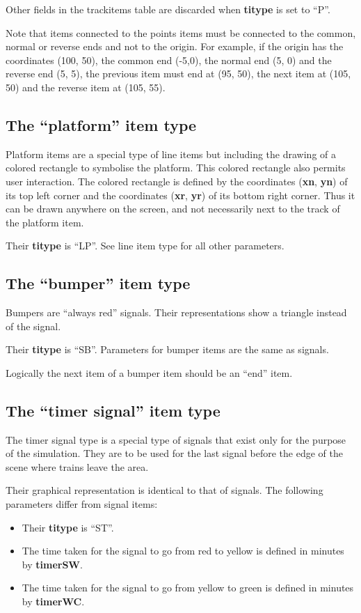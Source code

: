 \documentclass[12pt,a4paper]{article}
\begin{document}
Other fields in the trackitems table are discarded when \textbf{titype} is set to ``P''.

Note that items connected to the points items must be connected to the common, normal or reverse ends and not to the origin. For example, if the origin has the coordinates (100, 50), the common end (-5,0), the normal end (5, 0) and the reverse end (5, 5), the previous item must end at (95, 50), the next item at (105, 50) and the reverse item at (105, 55).

\subsection{The ``platform'' item type}
Platform items are a special type of line items but including the drawing of a colored rectangle to symbolise the platform. This colored rectangle also permits user interaction. The colored rectangle is defined by the coordinates (\textbf{xn}, \textbf{yn}) of its top left corner and the coordinates (\textbf{xr}, \textbf{yr}) of its bottom right corner. Thus it can be drawn anywhere on the screen, and not necessarily next to the track of the platform item.

Their \textbf{titype} is ``LP''. See line item type for all other parameters.

\subsection{The ``bumper'' item type}
Bumpers are ``always red'' signals. Their representations show a triangle instead of the signal.

Their \textbf{titype} is ``SB''. Parameters for bumper items are the same as signals. 

Logically the next item of a bumper item should be an ``end'' item.

\subsection{The ``timer signal'' item type}
The timer signal type is a special type of signals that exist only for the purpose of the simulation. They are to be used for the last signal before the edge of the scene where trains leave the area.

Their graphical representation is identical to that of signals. The following parameters differ from signal items:
\begin{itemize}
 \item Their \textbf{titype} is ``ST''.
 \item The time taken for the signal to go from red to yellow is defined in minutes by \textbf{timerSW}.
 \item The time taken for the signal to go from yellow to green is defined in minutes by \textbf{timerWC}.
\end{itemize}
\end{document}
